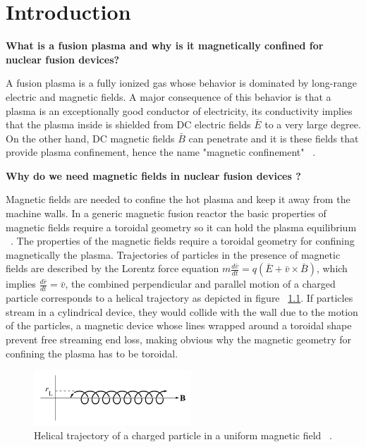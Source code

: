 \chapter{Introduction}

\textbf{What is a fusion plasma and why is it magnetically confined for nuclear fusion devices?}

A fusion plasma is a fully ionized gas whose behavior is dominated by long-range electric and magnetic fields. A major consequence of this behavior is that a plasma is an exceptionally good conductor of electricity, its conductivity implies that the plasma inside is shielded from DC electric fields $\bar{E}$ to a very large degree. On the other hand, DC magnetic fields $\bar{B}$ can penetrate and it is these fields that provide plasma confinement, hence the name "magnetic confinement" ~\cite[Chapter~6]{Freidberg2007}.\smallskip

\textbf{Why do we need magnetic fields in nuclear fusion devices ?}
\smallskip

Magnetic fields are needed to confine the hot plasma and keep it away from the machine walls.  In a generic magnetic fusion reactor the basic properties of magnetic fields require  a toroidal geometry so it can hold the plasma equilibrium ~\cite[Chapter~4]{Freidberg2007}. The properties of the magnetic fields require a toroidal geometry for confining magnetically the plasma. Trajectories of particles in the presence of magnetic fields are described by the Lorentz force equation $m \frac{d\bar{v}}{dt}=q(\bar{E}+\bar{v}\times \bar{B})$, which implies $\frac{d\bar{r}}{dt}=\bar{v}$, the combined perpendicular and parallel motion of a charged particle corresponds to a helical trajectory as  depicted in figure ~\ref{Helical}. If particles stream in a cylindrical device, they would collide with the wall due to the motion of the particles, a magnetic device whose lines wrapped around  a toroidal shape  prevent free streaming end loss, making obvious why the magnetic geometry for confining the plasma has to be toroidal.\smallskip

\begin{figure}
	\centering
	\includegraphics[width=0.525\textwidth]{Chp1/Helical_tray.png}
	\caption{  Helical trajectory of a charged particle in a uniform magnetic field ~\cite[Chapter~8]{Freidberg2007}.\label{Helical}}
\end{figure}

